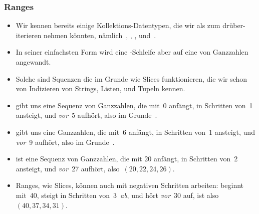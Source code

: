 \documentclass[aspectratio=169,mathserif,notheorems]{beamer}%
\begin{document}
\begin{frame}%
\frametitle{Ranges}%
\begin{itemize}%
\item Wir kennen bereits einige Kollektions-Datentypen, die wir als  zum drüber-iterieren nehmen könnten, nämlich~, , , und~.%
%
\item<2-> In seiner einfachsten Form wird eine -Schleife aber auf eine  von Ganzzahlen angewandt\cite{PSF:P3D:TPT:MCFT}.%
%
\item<3-> Solche  sind Squenzen die im Grunde wie Slices funktionieren, die wir schon von Indizieren von Strings, Listen, und Tupeln kennen.%
%
\item<4->  gibt uns eine Sequenz von Ganzzahlen, die mit~0 anfängt, in Schritten von~1 ansteigt, und \emph{vor}~5 aufhört, also im Grunde~.%
%
\item<5->  gibt uns eine Ganzzahlen, die mit~6 anfängt, in Schritten von~1 ansteigt, und \emph{vor}~9 aufhört, also im Grunde~.%
%
\item<6->  ist eine Sequenz von Ganzzahlen, die mit 20 anfängt, in Schritten von~2 ansteigt, und \emph{vor}~27 aufhört, also~$(20, 22, 24, 26)$.%
%
\item<7-> Ranges, wie Slices, können auch mit negativen Schritten arbeiten:  beginnt mit~40, steigt in Schritten von~3~\emph{ab}, und hört \emph{vor}~30 auf, ist also~$(40, 37, 34, 31)$.%
\end{itemize}%
\end{frame}%
%
%
\end{document}
